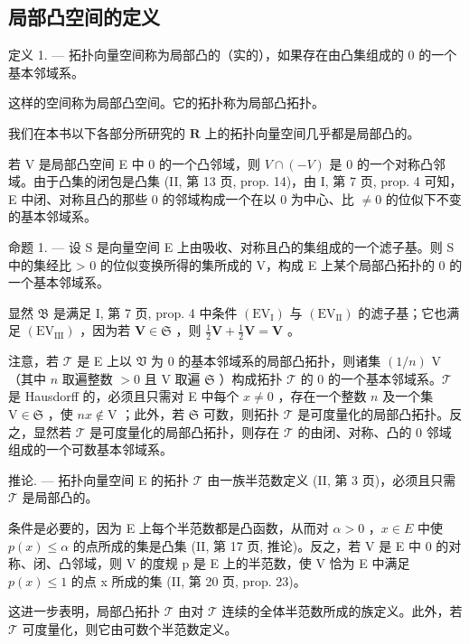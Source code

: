 \subsection{局部凸空间的定义}

定义 1. --- 拓扑向量空间称为局部凸的（实的），如果存在由凸集组成的 0 的一个基本邻域系。

这样的空间称为局部凸空间。它的拓扑称为局部凸拓扑。

我们在本书以下各部分所研究的 \(\mathbf{R}\) 上的拓扑向量空间几乎都是局部凸的。

若 V 是局部凸空间 E 中 0 的一个凸邻域，则 \(V \cap (-V)\) 是 0 的一个对称凸邻域。由于凸集的闭包是凸集 (II, 第 13 页, prop. 14)，由 I, 第 7 页, prop. 4 可知，E 中闭、对称且凸的那些 0 的邻域构成一个在以 0 为中心、比 \(\neq 0\) 的位似下不变的基本邻域系。

命题 1. --- 设 S 是向量空间 E 上由吸收、对称且凸的集组成的一个滤子基。则 S 中的集经比 \textgreater{} 0 的位似变换所得的集所成的 V，构成 E 上某个局部凸拓扑的 0 的一个基本邻域系。

显然 \(\mathfrak{B}\) 是满足 I, 第 7 页, prop. 4 中条件 \((\mathrm{EV}_{\mathrm{I}})\) 与 \((\mathrm{EV}_{\mathrm{II}})\) 的滤子基；它也满足 \((\mathrm{EV}_{\mathrm{III}})\) ，因为若 \(\mathbf{V} \in \mathfrak{S}\) ，则 \(\frac{1}{2}\mathbf{V} + \frac{1}{2}\mathbf{V} = \mathbf{V}\) 。

注意，若 \(\mathcal{T}\) 是 E 上以 \(\mathfrak{V}\) 为 0 的基本邻域系的局部凸拓扑，则诸集 \((1/n)\) V（其中 \(n\) 取遍整数 \(>0\) 且 V 取遍 \(\mathfrak{S}\) ）构成拓扑 \(\mathcal{T}\) 的 0 的一个基本邻域系。\(\mathcal{T}\) 是 Hausdorff 的，必须且只需对 E 中每个 \(x \neq 0\) ，存在一个整数 \(n\) 及一个集 \(\mathrm{V} \in \mathfrak{S}\) ，使 \(nx \notin \mathrm{V}\) ；此外，若 \(\mathfrak{S}\) 可数，则拓扑 \(\mathcal{T}\) 是可度量化的局部凸拓扑。反之，显然若 \(\mathcal{T}\) 是可度量化的局部凸拓扑，则存在 \(\mathcal{T}\) 的由闭、对称、凸的 0 邻域组成的一个可数基本邻域系。

推论. --- 拓扑向量空间 E 的拓扑 \(\mathcal{T}\) 由一族半范数定义 (II, 第 3 页)，必须且只需 \(\mathcal{T}\) 是局部凸的。

条件是必要的，因为 E 上每个半范数都是凸函数，从而对 \(\alpha > 0\) ，\(x \in E\) 中使 \(p(x) \leqslant \alpha\) 的点所成的集是凸集 (II, 第 17 页, 推论)。反之，若 V 是 E 中 0 的对称、闭、凸邻域，则 V 的度规 p 是 E 上的半范数，使 V 恰为 E 中满足 \(p(x) \leqslant 1\) 的点 x 所成的集 (II, 第 20 页, prop. 23)。

这进一步表明，局部凸拓扑 \(\mathcal{T}\) 由对 \(\mathcal{T}\) 连续的全体半范数所成的族定义。此外，若 \(\mathcal{T}\) 可度量化，则它由可数个半范数定义。

